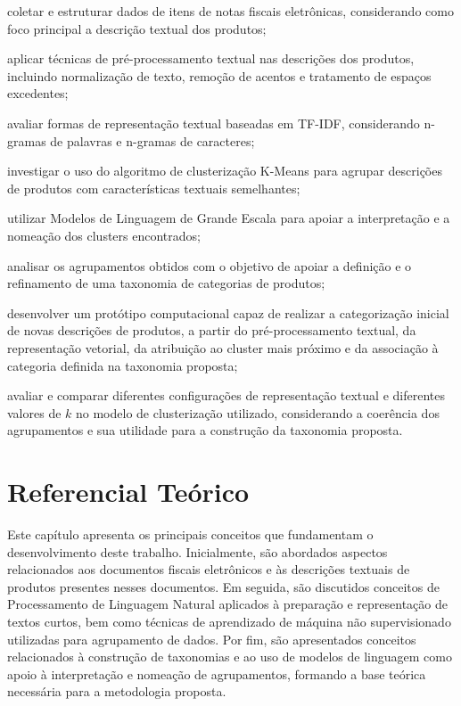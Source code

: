 \documentclass[english,brazilian]{UNISINOSmonografia}
\begin{document}
\begin{alineas}
    \item coletar e estruturar dados de itens de notas fiscais eletrônicas, considerando como foco principal a descrição textual dos produtos;
    \item aplicar técnicas de pré-processamento textual nas descrições dos produtos, incluindo normalização de texto, remoção de acentos e tratamento de espaços excedentes;
    \item avaliar formas de representação textual baseadas em TF-IDF, considerando n-gramas de palavras e n-gramas de caracteres;
    \item investigar o uso do algoritmo de clusterização K-Means para agrupar descrições de produtos com características textuais semelhantes;
    \item utilizar Modelos de Linguagem de Grande Escala para apoiar a interpretação e a nomeação dos clusters encontrados;
    \item analisar os agrupamentos obtidos com o objetivo de apoiar a definição e o refinamento de uma taxonomia de categorias de produtos;
    \item desenvolver um protótipo computacional capaz de realizar a categorização inicial de novas descrições de produtos, a partir do pré-processamento textual, da representação vetorial, da atribuição ao cluster mais próximo e da associação à categoria definida na taxonomia proposta;
    \item avaliar e comparar diferentes configurações de representação textual e diferentes valores de $k$ no modelo de clusterização utilizado, considerando a coerência dos agrupamentos e sua utilidade para a construção da taxonomia proposta.
\end{alineas}

















\chapter{Referencial Teórico}

Este capítulo apresenta os principais conceitos que fundamentam o desenvolvimento deste trabalho. Inicialmente, são abordados aspectos relacionados aos documentos fiscais eletrônicos e às descrições textuais de produtos presentes nesses documentos. Em seguida, são discutidos conceitos de Processamento de Linguagem Natural aplicados à preparação e representação de textos curtos, bem como técnicas de aprendizado de máquina não supervisionado utilizadas para agrupamento de dados. Por fim, são apresentados conceitos relacionados à construção de taxonomias e ao uso de modelos de linguagem como apoio à interpretação e nomeação de agrupamentos, formando a base teórica necessária para a metodologia proposta.
\end{document}
